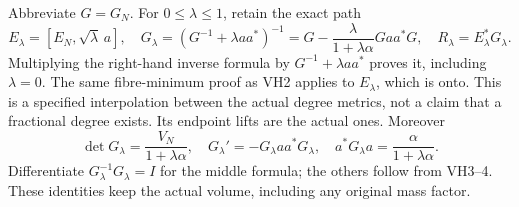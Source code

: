 Abbreviate \(G=G_N\). For \(0\le\lambda\le1\), retain the exact path
\begin{equation}\tag{VH4}\label{hvh:VH4}
E_\lambda=[E_N,\sqrt\lambda\,a],\quad
G_\lambda=(G^{-1}+\lambda aa^*)^{-1}
=G-\frac{\lambda}{1+\lambda\alpha}Gaa^*G,\quad
R_\lambda=E_\lambda^*G_\lambda.
\end{equation}
Multiplying the right-hand inverse formula by \(G^{-1}+\lambda aa^*\)
proves it, including \(\lambda=0\). The same fibre-minimum proof as
VH2 applies to \(E_\lambda\), which is onto. This is a specified
interpolation between the actual degree metrics, not a claim that a
fractional degree exists. Its endpoint lifts are the actual ones.
Moreover
\begin{equation}\tag{VH5}\label{hvh:VH5}
\det G_\lambda=\frac{V_N}{1+\lambda\alpha},\quad
G_\lambda'=-G_\lambda aa^*G_\lambda,\quad
a^*G_\lambda a=\frac{\alpha}{1+\lambda\alpha}.
\end{equation}
Differentiate \(G_\lambda^{-1}G_\lambda=I\) for the middle formula;
the others follow from VH3--4. These identities keep the actual
volume, including any original mass factor.

